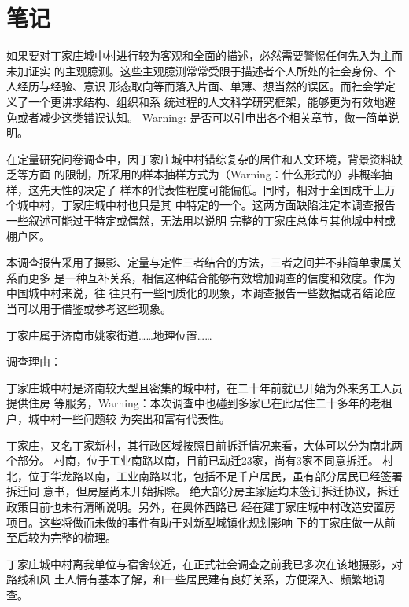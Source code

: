 \chapter{笔记}
\label{cha:notes}

如果要对丁家庄城中村进行较为客观和全面的描述，必然需要警惕任何先入为主而未加证实
的主观臆测。这些主观臆测常常受限于描述者个人所处的社会身份、个人经历与经验、意识
形态取向等而落入片面、单薄、想当然的误区。而社会学定义了一个更讲求结构、组织和系
统过程的人文科学研究框架，能够更为有效地避免或者减少这类错误认知。
Warning: 是否可以引申出各个相关章节，做一简单说明。

在定量研究问卷调查中，因丁家庄城中村错综复杂的居住和人文环境，背景资料缺乏等方面
的限制，所采用的样本抽样方式为（Warning：什么形式的）非概率抽样，这先天性的决定了
样本的代表性程度可能偏低。同时，相对于全国成千上万个城中村，丁家庄城中村也只是其
中特定的一个。这两方面缺陷注定本调查报告一些叙述可能过于特定或偶然，无法用以说明
完整的丁家庄总体与其他城中村或棚户区。

本调查报告采用了摄影、定量与定性三者结合的方法，三者之间并不非简单隶属关系而更多
是一种互补关系，相信这种结合能够有效增加调查的信度和效度。作为中国城中村来说，往
往具有一些同质化的现象，本调查报告一些数据或者结论应当可以用于借鉴或参考这些现象。

丁家庄属于济南市姚家街道……地理位置……

调查理由：

丁家庄城中村是济南较大型且密集的城中村，在二十年前就已开始为外来务工人员提供住房
等服务，Warning：本次调查中也碰到多家已在此居住二十多年的老租户，城中村一些问题较
为突出和富有代表性。

丁家庄，又名丁家新村，其行政区域按照目前拆迁情况来看，大体可以分为南北两个部分。
村南，位于工业南路以南，目前已动迁23家，尚有3家不同意拆迁。
村北，位于华龙路以南，工业南路以北，包括不足千户居民，虽有部分居民已经签署拆迁同
意书，但房屋尚未开始拆除。
绝大部分房主家庭均未签订拆迁协议，拆迁政策目前也未有清晰说明。另外，在奥体西路已
经在建丁家庄城中村改造安置房项目。这些将做而未做的事件有助于对新型城镇化规划影响
下的丁家庄做一从前至后较为完整的梳理。

丁家庄城中村离我单位与宿舍较近，在正式社会调查之前我已多次在该地摄影，对路线和风
土人情有基本了解，和一些居民建有良好关系，方便深入、频繁地调查。

